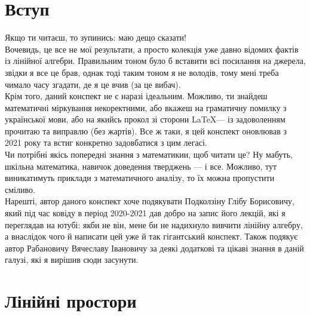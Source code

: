 \documentclass{math_library}
\begin{document}


\hypersetup{linkcolor=black}
\tableofcontents
\newpage


  
	\section*{Вступ}
	Якщо ти читаєш, то зупинись: маю дещо сказати!
	\bigskip \\	
	Вочевидь, це все не мої результати, а просто колекція уже давно відомих фактів із лінійної алгебри. Правильним тоном було б вставити всі посилання на джерела, звідки я все це брав, однак тоді таким тоном я не володів, тому мені треба чимало часу згадати, де я це вчив (за це вибач).
	\bigskip \\
	Крім того, даний конспект не є наразі ідеальним. Можливо, ти знайдеш математичні міркування некоректними, або вкажеш на граматичну помилку з української мови, або на якийсь прокол зі сторони \LaTeX --- із задоволенням прочитаю та виправлю (без жартів). Все ж таки, я цей конспект оновлював з 2021 року та встиг конкретно задовбатися з цим легасі.
	\bigskip \\
	Чи потрібні якісь попередні знання з математикии, щоб читати це? Ну мабуть, шкільна математика, навичок доведення тверджень --- і все. Можливо, тут виникатимуть приклади з математичного аналізу, то їх можна пропустити сміливо.
	\bigskip \\
	Нарешті, автор даного конспект хоче подякувати Подколзіну Глібу Борисовичу, який під час ковіду в період 2020-2021 дав добро на запис його лекцій, які я переглядав на ютубі: якби не він, мене би не надихнуло вивчити лінійну алгебру, а внаслідок чого й написати цей уже й так гігантський конспект. Також подякує автор Рабановичу Вячеславу Івановичу за деякі додаткові та цікаві знання в даній галузі, які я вирішив сюди засунути.
	\newpage

	\section{Лінійні простори}
\end{document}
